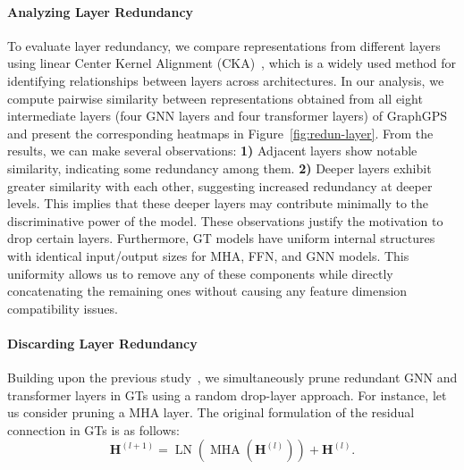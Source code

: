 \documentclass[letterpaper]{article} %
\begin{document}
\paragraph{Analyzing Layer Redundancy} 
To evaluate layer redundancy, we compare representations from different layers using linear Center Kernel Alignment (CKA)~\cite{cka}, which is a widely used method for identifying relationships between layers across architectures. In our analysis, we compute pairwise similarity between representations obtained from all eight intermediate layers (four GNN layers and four transformer layers) of GraphGPS and present the corresponding heatmaps in Figure~\ref{fig:redun-layer}. From the results, we can make several observations: \textbf{1)} Adjacent layers show notable similarity, indicating some redundancy among them.   \textbf{2)} Deeper layers exhibit greater similarity with each other, suggesting increased redundancy at deeper levels. This implies that these deeper layers may contribute minimally to the discriminative power of the model.  These observations justify the motivation to drop certain layers.  Furthermore,  GT models have uniform internal structures with identical input/output sizes for MHA, FFN, and GNN models. This uniformity allows us to remove any of these components while directly concatenating the remaining ones without causing any feature dimension compatibility issues.






\paragraph{Discarding Layer Redundancy} 
Building upon the previous study~\cite{layer-drop}, we simultaneously prune redundant GNN and transformer layers in GTs using a random drop-layer approach. For instance, let us consider pruning a MHA layer. The original formulation of the residual connection in GTs is as follows:
\begin{equation}
\mathbf{H}^{(l+1)}=\operatorname{LN}\left(\operatorname{MHA}\left(\mathbf{H}^{(l)}\right)\right)+\mathbf{H}^{(l)}.
\label{eq:residual}
\end{equation}
\end{document}
